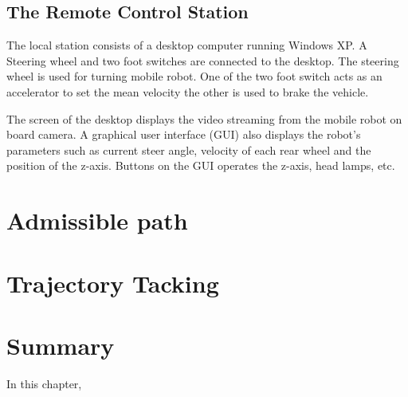 \subsection{The Remote Control Station}   
The local station consists of a desktop computer running Windows XP. A Steering wheel and two foot switches are connected to the desktop. The steering wheel is used for turning  mobile robot. One of the two foot switch acts as an accelerator to set the mean velocity the other  is used to brake the vehicle.

The screen of the desktop displays the video streaming  from the mobile robot on board camera. A graphical user  interface (GUI) also displays the robot's parameters such as current steer angle, velocity of each rear wheel and the position of the z-axis. Buttons on the GUI operates the z-axis, head lamps, etc.



\section{Admissible path}
\section{Trajectory Tacking}


\section{Summary}
In this chapter, 